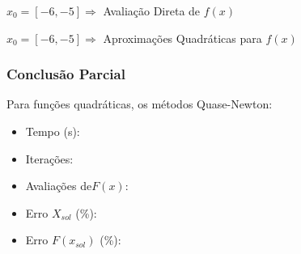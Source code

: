         \begin{minipage}[h!]{\linewidth}
            \centering
            $x_0=[-6,-5]\Longrightarrow$  Avaliação Direta de $f(x)$            
            \label{tab:tblv} 
            \writetable{\tblv}\par
            \bigskip
            \centering
            $x_0=[-6,-5]\Longrightarrow$  Aproximações Quadráticas para $f(x)$
            \label{tab:tblx} 
            \writetable{\tblx}
        \end{minipage}

        \subsubsection{Conclusão Parcial}
            Para funções quadráticas, os métodos Quase-Newton:
            \begin{itemize}
            \item {Tempo (s):} 
            \item {Iterações:} 
            \item {Avaliações de$F(x)$:} 
            \item {Erro $X_{sol}$ (\%):} 
            \item {Erro $F(x_{sol})$ (\%):} 
            \end{itemize}

\newpage